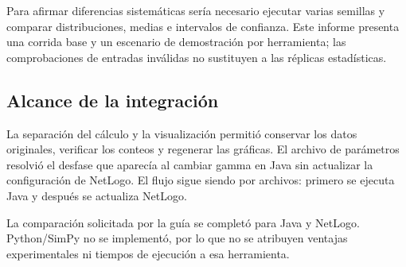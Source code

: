 \documentclass[11pt,a4paper]{article}
\begin{document}
Para afirmar diferencias sistemáticas sería necesario ejecutar varias semillas y comparar distribuciones, medias e intervalos de confianza. Este informe presenta una corrida base y un escenario de demostración por herramienta; las comprobaciones de entradas inválidas no sustituyen a las réplicas estadísticas.

\subsection{Alcance de la integración}
La separación del cálculo y la visualización permitió conservar los datos originales, verificar los conteos y regenerar las gráficas. El archivo de parámetros resolvió el desfase que aparecía al cambiar gamma en Java sin actualizar la configuración de NetLogo. El flujo sigue siendo por archivos: primero se ejecuta Java y después se actualiza NetLogo.

La comparación solicitada por la guía se completó para Java y NetLogo. Python/SimPy no se implementó, por lo que no se atribuyen ventajas experimentales ni tiempos de ejecución a esa herramienta.
\end{document}
